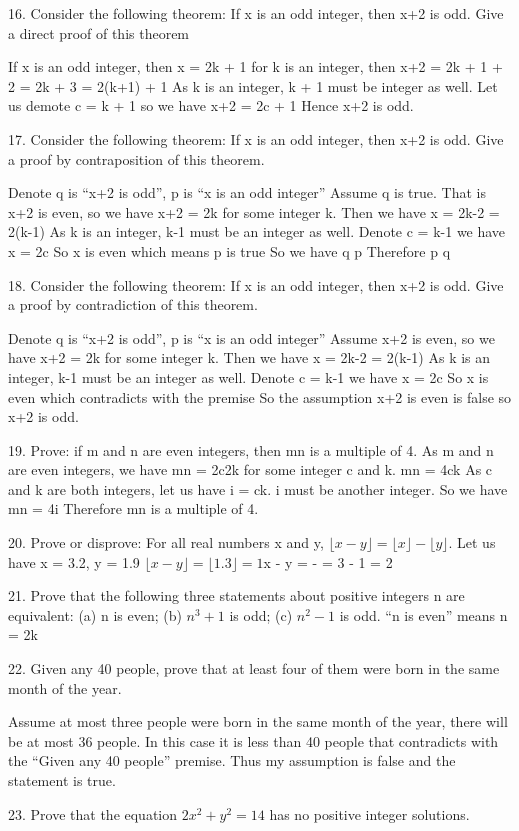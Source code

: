 \documentclass{article}
\begin{document}
16. Consider the following theorem: If x is an odd integer, then x+2 is odd. Give a direct proof of this theorem

If x is an odd integer, then x = 2k + 1 for k is an integer, then x+2 = 2k + 1 + 2 = 2k + 3 = 2(k+1) + 1
As k is an integer, k + 1 must be integer as well. Let us demote c = k + 1 so we have x+2 = 2c + 1
Hence x+2 is odd.

17. Consider the following theorem: If x is an odd integer, then x+2 is odd. Give a proof by contraposition of this theorem.

Denote q is ``x+2 is odd'', p is ``x is an odd integer''
Assume \lnot q is true. That is x+2 is even, so we have x+2 = 2k for some integer k.
Then we have x = 2k-2 = 2(k-1)
As k is an integer, k-1 must be an integer as well. Denote c = k-1 we have x = 2c
So x is even which means \lnot p is true
So we have \lnot q \to \lnot p
Therefore p \to q

18. Consider the following theorem: If x is an odd integer, then x+2 is odd. Give a proof by contradiction of this theorem.

Denote q is ``x+2 is odd'', p is ``x is an odd integer''
Assume x+2 is even, so we have x+2 = 2k for some integer k.
Then we have x = 2k-2 = 2(k-1)
As k is an integer, k-1 must be an integer as well. Denote c = k-1 we have x = 2c
So x is even which contradicts with the premise
So the assumption x+2 is even is false so x+2 is odd.

19. Prove: if m and n are even integers, then mn is a multiple of 4.
As m and n are even integers, we have mn = 2c2k for some integer c and k.
mn = 4ck
As c and k are both integers, let us have i = ck. i must be another integer.
So we have mn = 4i
Therefore mn is a multiple of 4.

20. Prove or disprove: For all real numbers x and y, $\lfloor x-y\rfloor =\lfloor x \rfloor -\lfloor y \rfloor$.
Let us have x = 3.2, y = 1.9
$\lfloor x-y\rfloor = \lfloor 1.3 \rfloor = 1
$\lfloor x \rfloor - \lfloor y \rfloor =  \rfloor -  \rfloor = 3 - 1 = 2

21. Prove that the following three statements about positive integers n are equivalent: (a) n is even; (b) $n^3+1$ is odd; (c) $n^2-1$ is odd.
``n is even'' means n = 2k

22. Given any 40 people, prove that at least four of them were born in the same month of the year.

Assume at most three people were born in the same month of the year, there will be at most 36 people. In this case it is less than 40 people that contradicts with the ``Given any 40 people'' premise. 
Thus my assumption is false and the statement is true.

23. Prove that the equation $2x^2+y^2=14$ has no positive integer solutions.
\end{document}
